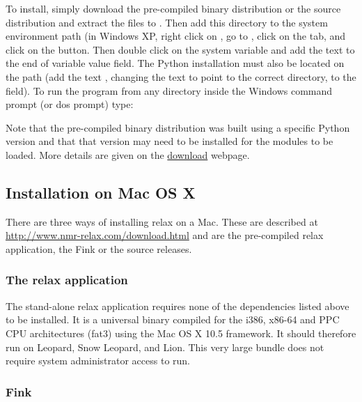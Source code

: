 To install, simply download the pre-compiled binary distribution  or the source distribution  and extract the files to .  Then add this directory to the system environment path (in Windows XP, right click on , go to , click on the  tab, and click on the  button.  Then double click on the  system variable and add the text  to the end of variable value field.  The Python installation must also be located on the path (add the text , changing the text to point to the correct directory, to the field).  To run the program from any directory inside the Windows command prompt (or dos prompt) type:



Note that the pre-compiled binary distribution was built using a specific Python version and that that version may need to be installed for the modules to be loaded.  More details are given on the \href{http://www.nmr-relax.com/download.html}{download} webpage.


\subsection{Installation on Mac OS X}

There are three ways of installing relax on a Mac.  These are described at \href{http://www.nmr-relax.com/download.html}{http://www.nmr-relax.com/download.html} and are the pre-compiled relax application, the Fink or the source releases.

\subsubsection{The relax application}

The stand-alone relax application requires none of the dependencies listed above to be installed.  It is a universal binary compiled for the i386, x86-64 and PPC CPU architectures (fat3) using the Mac OS X 10.5 framework.  It should therefore run on Leopard, Snow Leopard, and Lion.  This very large bundle does not require system administrator access to run.

\subsubsection{Fink}

